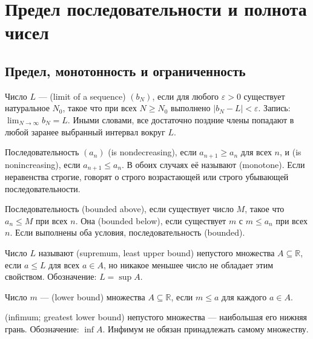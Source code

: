 \chapter{Предел последовательности и полнота чисел}\label{chap:c12-limits}
\section{Предел, монотонность и ограниченность}
\begin{definition}
Число \(L\) —  (limit of a sequence) \((b_N)\), если для любого \(\varepsilon>0\) существует натуральное \(N_0\), такое что при всех \(N\geq N_0\) выполнено \(|b_N-L|<\varepsilon\). Запись: \(\lim_{N\to\infty}b_N=L\). Иными словами, все достаточно поздние члены попадают в любой заранее выбранный интервал вокруг \(L\).
\end{definition}
\begin{definition}
Последовательность \((a_n)\)  (is nondecreasing), если \(a_{n+1}\geq a_n\) для всех \(n\), и  (is nonincreasing), если \(a_{n+1}\leq a_n\). В обоих случаях её называют  (monotone). Если неравенства строгие, говорят о строго возрастающей или строго убывающей последовательности.
\end{definition}
\begin{definition}
Последовательность  (bounded above), если существует число \(M\), такое что \(a_n\leq M\) при всех \(n\). Она  (bounded below), если существует \(m\) с \(m\leq a_n\) при всех \(n\). Если выполнены оба условия, последовательность  (bounded).
\end{definition}
\begin{definition}
Число \(L\) называют  (supremum, least upper bound) непустого множества \(A\subseteq\mathbb R\), если \(a\leq L\) для всех \(a\in A\), но никакое меньшее число не обладает этим свойством. Обозначение: \(L=\sup A\).
\end{definition}
\begin{definition}
Число \(m\) —  (lower bound) множества \(A\subseteq\mathbb R\), если \(m\le a\) для каждого \(a\in A\).\end{definition}
\begin{definition} (infimum; greatest lower bound) непустого множества — наибольшая его нижняя грань. Обозначение: \(\inf A\). Инфимум не обязан принадлежать самому множеству.
\end{definition}
